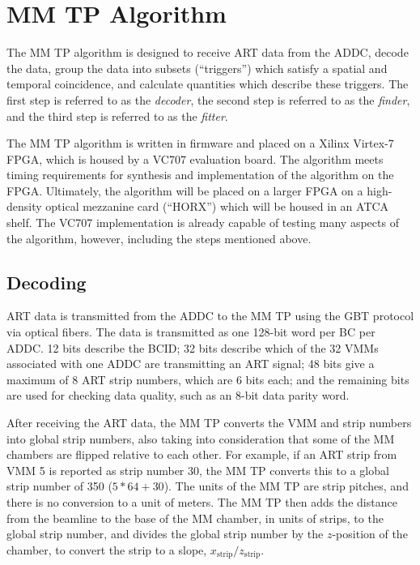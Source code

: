 \section{MM TP Algorithm}
\label{sec:alg}

The MM TP algorithm is designed to receive ART data from the ADDC, decode the data, group the data into subsets (``triggers'') which satisfy a spatial and temporal coincidence, and calculate quantities which describe these triggers. The first step is referred to as the \textit{decoder}, the second step is referred to as the \textit{finder}, and the third step is referred to as the \textit{fitter}.

The MM TP algorithm is written in firmware and placed on a Xilinx Virtex-7 FPGA, which is housed by a VC707 evaluation board. The algorithm meets timing requirements for synthesis and implementation of the algorithm on the FPGA. Ultimately, the algorithm will be placed on a larger FPGA on a high-density optical mezzanine card (``HORX'') which will be housed in an ATCA shelf. The VC707 implementation is already capable of testing many aspects of the algorithm, however, including the steps mentioned above.

\subsection{Decoding}
\label{sec:alg-decode}

ART data is transmitted from the ADDC to the MM TP using the GBT protocol via optical fibers. The data is transmitted as one 128-bit word per BC per ADDC. 12 bits describe the BCID; 32 bits describe which of the 32 VMMs associated with one ADDC are transmitting an ART signal; 48 bits give a maximum of 8 ART strip numbers, which are 6 bits each; and the remaining bits are used for checking data quality, such as an 8-bit data parity word.

After receiving the ART data, the MM TP converts the VMM and strip numbers into global strip numbers, also taking into consideration that some of the MM chambers are flipped relative to each other. For example, if an ART strip from VMM 5 is reported as strip number 30, the MM TP converts this to a global strip number of 350 ($5*64 + 30$). The units of the MM TP are strip pitches, and there is no conversion to a unit of meters. The MM TP then adds the distance from the beamline to the base of the MM chamber, in units of strips, to the global strip number, and divides the global strip number by the $z$-position of the chamber, to convert the strip to a slope, $x_\text{strip} / z_\text{strip}$.

